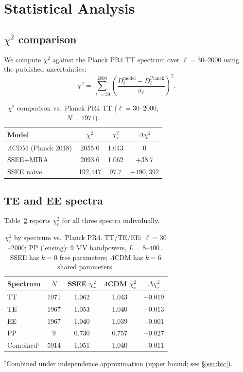 \documentclass[12pt,a4paper]{article}
\begin{document}
\section{Statistical Analysis}
\label{sec:stats}

\subsection{\texorpdfstring{$\chi^2$}{chi-squared} comparison}

We compute $\chi^2$ against the Planck PR4 TT spectrum over $\ell=30$--$2000$
using the published uncertainties:
\begin{equation}
\chi^2 = \sum_{\ell=30}^{2000}
\left(\frac{D_\ell^{\mathrm{model}} - D_\ell^{\mathrm{Planck}}}{\sigma_\ell}\right)^2.
\end{equation}

\begin{table}[ht]
\centering
\caption{$\chi^2$ comparison vs.\ Planck PR4 TT ($\ell=30$--$2000$, $N=1971$).}
\label{tab:chi2}
\begin{tabular}{lccc}
\toprule
Model & $\chi^2$ & $\chi^2_r$ & $\Delta\chi^2$ \\
\midrule
$\Lambda$CDM (Planck 2018) & 2055.0 & 1.043 & 0 \\
SSEE+MIRA & 2093.6 & 1.062 & $+38.7$ \\
SSEE naive & 192{,}447 & 97.7 & $+190{,}392$ \\
\bottomrule
\end{tabular}
\end{table}

\subsection{TE and EE spectra}

Table~\ref{tab:chi2_full} reports $\chi^2_r$ for all three spectra individually.

\begin{table}[ht]
\centering
\caption{$\chi^2_r$ by spectrum vs.\ Planck PR4.
TT/TE/EE: $\ell=30$--$2000$; PP (lensing): 9 MV bandpowers, $L=8$--$400$
\citep[Table~1,][]{PlanckLensing2018}.
SSEE has $k=0$ free parameters; $\Lambda$CDM has $k=6$ shared parameters.}
\label{tab:chi2_full}
\begin{tabular}{lcccc}
\toprule
Spectrum & $N$ & SSEE $\chi^2_r$ & $\Lambda$CDM $\chi^2_r$ & $\Delta\chi^2_r$ \\
\midrule
TT & 1971 & 1.062 & 1.043 & $+0.019$ \\
TE & 1967 & 1.053 & 1.040 & $+0.013$ \\
EE & 1967 & 1.040 & 1.039 & $+0.001$ \\
PP & 9    & 0.730 & 0.757 & $-0.027$ \\
\midrule
Combined$^{\dagger}$ & 5914 & 1.051 & 1.040 & $+0.011$ \\
\bottomrule
\end{tabular}
{\footnotesize $^{\dagger}$Combined under independence approximation (upper bound; see \S\ref{sec:bic}).}
\end{table}
\end{document}
